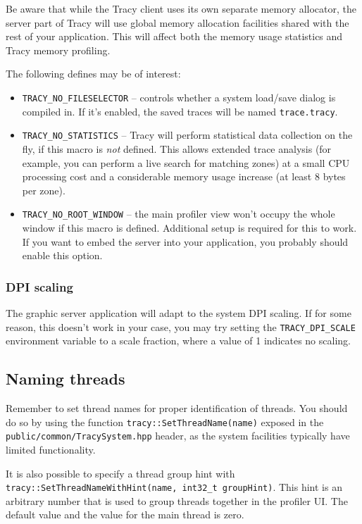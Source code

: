 \documentclass[hidelinks,titlepage,a4paper,twoside]{article}
\begin{document}
Be aware that while the Tracy client uses its own separate memory allocator, the server part of Tracy will use global memory allocation facilities shared with the rest of your application. This will affect both the memory usage statistics and Tracy memory profiling.

The following defines may be of interest:

\begin{itemize}
\item \texttt{TRACY\_NO\_FILESELECTOR} -- controls whether a system load/save dialog is compiled in. If it's enabled, the saved traces will be named \texttt{trace.tracy}.
\item \texttt{TRACY\_NO\_STATISTICS} -- Tracy will perform statistical data collection on the fly, if this macro is \emph{not} defined. This allows extended trace analysis (for example, you can perform a live search for matching zones) at a small CPU processing cost and a considerable memory usage increase (at least 8 bytes per zone).
\item \texttt{TRACY\_NO\_ROOT\_WINDOW} -- the main profiler view won't occupy the whole window if this macro is defined. Additional setup is required for this to work. If you want to embed the server into your application, you probably should enable this option.
\end{itemize}

\subsubsection{DPI scaling}

The graphic server application will adapt to the system DPI scaling. If for some reason, this doesn't work in your case, you may try setting the \texttt{TRACY\_DPI\_SCALE} environment variable to a scale fraction, where a value of 1 indicates no scaling.

\subsection{Naming threads}
\label{namingthreads}

Remember to set thread names for proper identification of threads. You should do so by using the function \texttt{tracy::SetThreadName(name)} exposed in the \texttt{public/common/TracySystem.hpp} header, as the system facilities typically have limited functionality.

It is also possible to specify a thread group hint with \texttt{tracy::SetThreadNameWithHint(name, int32\_t groupHint)}. This hint is an arbitrary number that is used to group threads together in the profiler UI. The default value and the value for the main thread is zero.
\end{document}
